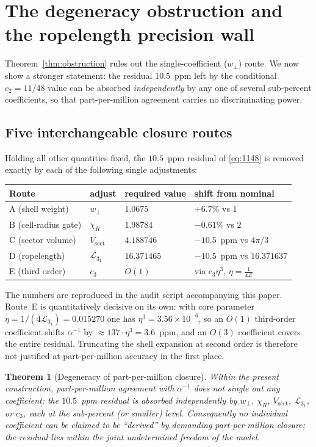 \documentclass[11pt,a4paper]{article}
\newtheorem{theorem}{Theorem}
\theoremstyle{definition}
\begin{document}
\section{The degeneracy obstruction and the ropelength precision wall}
\label{sec:degeneracy}

Theorem~\ref{thm:obstruction} rules out the single-coefficient ($w_\perp$) route.
We now show a stronger statement: the residual $10.5$~ppm left by the conditional
$c_2=11/48$ value can be absorbed \emph{independently} by any one of several
sub-percent coefficients, so that part-per-million agreement carries no
discriminating power.

\subsection*{Five interchangeable closure routes}
Holding all other quantities fixed, the $10.5$~ppm residual of \eqref{eq:1148} is
removed exactly by each of the following single adjustments:
\begin{center}
\renewcommand{\arraystretch}{1.25}
\begin{tabular}{@{}llll@{}}
\toprule
Route & adjust & required value & shift from nominal \\
\midrule
A (shell weight)   & $w_\perp$          & $1.0675$        & $+6.7\%$ vs $1$ \\
B (cell-radius gate)& $\chi_R$          & $1.98784$       & $-0.61\%$ vs $2$ \\
C (sector volume)  & $V_{\mathrm{sect}}$ & $4.188746$      & $-10.5$~ppm vs $4\pi/3$ \\
D (ropelength)     & $\mathcal{L}_{3_1}$ & $16.371465$     & $-10.5$~ppm vs $16.371637$ \\
E (third order)    & $c_3$              & $O(1)$          & via $c_3\eta^3$, $\eta=\tfrac{1}{4\mathcal{L}}$ \\
\bottomrule
\end{tabular}
\end{center}
The numbers are reproduced in the audit script accompanying this paper. Route~E is
quantitatively decisive on its own: with core parameter
$\eta=1/(4\mathcal{L}_{3_1})=0.015270$ one has $\eta^3=3.56\times10^{-6}$, so an
$O(1)$ third-order coefficient shifts $\alpha^{-1}$ by
$\approx 137\cdot\eta^3=3.6$~ppm, and an $O(3)$ coefficient covers the entire
residual. Truncating the shell expansion at second order is therefore not
justified at part-per-million accuracy in the first place.

\begin{theorem}[Degeneracy of part-per-million closure]
\label{thm:degeneracy}
Within the present construction, part-per-million agreement with $\alpha^{-1}$ does
not single out any coefficient: the $10.5$~ppm residual is absorbed independently
by $w_\perp$, $\chi_R$, $V_{\mathrm{sect}}$, $\mathcal{L}_{3_1}$, or $c_3$, each at
the sub-percent (or smaller) level. Consequently no individual coefficient can be
claimed to be ``derived'' by demanding part-per-million closure; the residual lies
within the joint undetermined freedom of the model.
\end{theorem}
\end{document}
